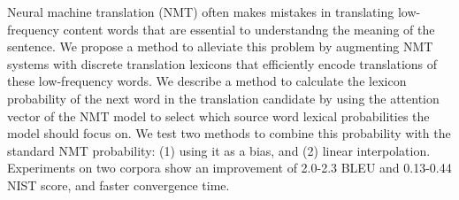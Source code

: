 Neural machine translation (NMT) often makes mistakes in translating low-frequency content words that are essential to understandng the meaning of the sentence. We propose a method to alleviate this problem by augmenting NMT systems with discrete translation lexicons that efficiently encode translations of these low-frequency words. We describe a method to calculate the lexicon probability of the next word in the translation candidate by using the attention vector of the NMT model to select which source word lexical probabilities the model should focus on. We test two methods to combine this probability with the standard NMT probability: (1) using it as a bias, and (2) linear interpolation. Experiments on two corpora show an improvement of 2.0-2.3 BLEU and 0.13-0.44 NIST score, and faster convergence time.
